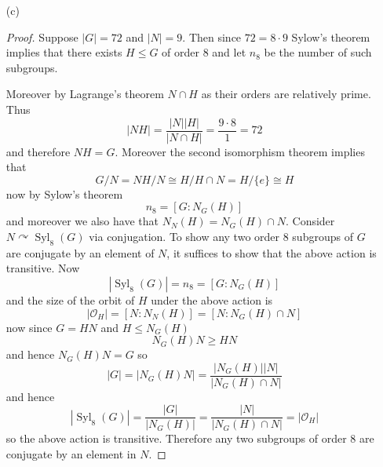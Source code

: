 \documentclass[12pt]{article}
\begin{document}
\begin{enumerate}
\begin{proof}
        Clearly
        \[ \pi(P) = \frac{PN}{N} \supseteq Q \]
        and moreover
        \[ |\pi(P)| = \frac{|PN|}{|N|} = p^{\alpha - \beta}n = |Q| \]
        therefore we have equality above. 
        Now observe that since $N$ is normal $N_G(P) \leq N_G(PN)$. This follows, as if $g \in N_G(P)$
        \[ gPNg^{-1} = gPg^{-1}gNg^{-1} = PN \]
        therefore
        \[ [N_G(PN) : N_G(P)] \in \mathbb N \]
        now $[g] \in N_{G/N}(Q)$ if and only if
        \[ [g]Q[g^{-1}] = Q \]
        but pulling back by $\pi$ this is equivalent to
        \[ gPNg^{-1} = PN \]
        i.e.
        \[ \pi^{-1}\Big(N_{G/N}(Q)\Big) = N_G(PN) \]
        and therefore
        \[ |N_{G/N}(Q)| = [N_G(PN) : N] \]
        putting this together
        \begin{align*}
        n_p(G/N) &= [G/N : N_{G/N}(Q)] \\
        &= \frac{[G:N]}{[N_G(PN) : N]} \\
        &= [G : N_G(PN)] \\
        &= \frac{[G : N_G(P)]}{[N_G(PN) : N_G(P)]} \\
        &= \frac{n_p(G)}{[N_G(PN) : N_G(P)]} \\
        \end{align*}
        and hence $n_{G/N}(Q) \mid n_{G}(P)$ as $[N_G(PN) : N_G(P)] \in \mathbb N$.
    \end{proof}

    \item[(c)]
    \begin{proof}
        Suppose $|G| = 72$ and $|N| = 9$. Then since $72 = 8 \cdot 9$
        Sylow's theorem implies that there exists $H \leq G$ of order 8
        and let $n_8$ be the number of such subgroups.
        
        Moreover by Lagrange's theorem $N \cap H$ as their orders are relatively prime.
        Thus
        \[ |NH| = \frac{|N||H|}{|N \cap H|} = \frac{9 \cdot 8}{1} = 72 \]
        and therefore $NH = G$. Moreover the second isomorphism theorem implies that
        \[ G/N = NH/N \cong H/H\cap N = H/\{ e \} \cong H \]
        now by Sylow's theorem
        \[ n_8 = [G : N_G(H)] \]
        and moreover we also have that $N_N(H) = N_G(H) \cap N$. Consider
        $N \curvearrowright \operatorname{Syl}_8(G)$ via conjugation. To show any two
        order 8 subgroups of $G$ are conjugate by an element of $N$, it suffices to show that the above action
        is transitive. Now
        \[ |\operatorname{Syl}_8(G)| = n_8 = [G : N_G(H)] \]
        and the size of the orbit of $H$ under the above action is
        \[ |\mathcal O_H| = [N : N_N(H)] = [N : N_G(H) \cap N] \]
        now since $G = HN$ and $H \leq N_G(H)$
        \[ N_G(H)N \geq HN \]
        and hence $N_G(H)N = G$ so
        \[ |G| = |N_G(H)N| = \frac{|N_G(H)||N|}{|N_G(H) \cap N|} \]
        and hence
        \[ |\operatorname{Syl}_8(G)| = \frac{|G|}{|N_G(H)|} = \frac{|N|}{|N_G(H) \cap N|} = |\mathcal O_H| \]
        so the above action is transitive. Therefore any two subgroups of order $8$
        are conjugate by an element in $N$.
    \end{proof}
\end{enumerate}
\end{document}
